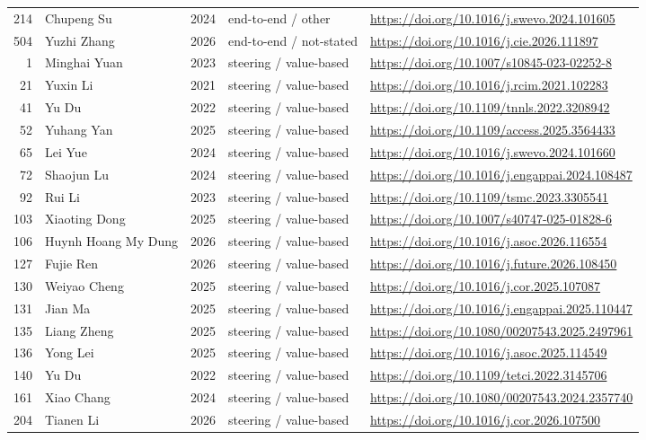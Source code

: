 \begin{longtable}{r p{3.0cm} r p{4.2cm} p{4.6cm}}
214 & Chupeng Su & 2024 & end-to-end / other & \url{https://doi.org/10.1016/j.swevo.2024.101605} \\
504 & Yuzhi Zhang & 2026 & end-to-end / not-stated & \url{https://doi.org/10.1016/j.cie.2026.111897} \\
1 & Minghai Yuan & 2023 & steering / value-based & \url{https://doi.org/10.1007/s10845-023-02252-8} \\
21 & Yuxin Li & 2021 & steering / value-based & \url{https://doi.org/10.1016/j.rcim.2021.102283} \\
41 & Yu Du & 2022 & steering / value-based & \url{https://doi.org/10.1109/tnnls.2022.3208942} \\
52 & Yuhang Yan & 2025 & steering / value-based & \url{https://doi.org/10.1109/access.2025.3564433} \\
65 & Lei Yue & 2024 & steering / value-based & \url{https://doi.org/10.1016/j.swevo.2024.101660} \\
72 & Shaojun Lu & 2024 & steering / value-based & \url{https://doi.org/10.1016/j.engappai.2024.108487} \\
92 & Rui Li & 2023 & steering / value-based & \url{https://doi.org/10.1109/tsmc.2023.3305541} \\
103 & Xiaoting Dong & 2025 & steering / value-based & \url{https://doi.org/10.1007/s40747-025-01828-6} \\
106 & Huynh Hoang My Dung & 2026 & steering / value-based & \url{https://doi.org/10.1016/j.asoc.2026.116554} \\
127 & Fujie Ren & 2026 & steering / value-based & \url{https://doi.org/10.1016/j.future.2026.108450} \\
130 & Weiyao Cheng & 2025 & steering / value-based & \url{https://doi.org/10.1016/j.cor.2025.107087} \\
131 & Jian Ma & 2025 & steering / value-based & \url{https://doi.org/10.1016/j.engappai.2025.110447} \\
135 & Liang Zheng & 2025 & steering / value-based & \url{https://doi.org/10.1080/00207543.2025.2497961} \\
136 & Yong Lei & 2025 & steering / value-based & \url{https://doi.org/10.1016/j.asoc.2025.114549} \\
140 & Yu Du & 2022 & steering / value-based & \url{https://doi.org/10.1109/tetci.2022.3145706} \\
161 & Xiao Chang & 2024 & steering / value-based & \url{https://doi.org/10.1080/00207543.2024.2357740} \\
204 & Tianen Li & 2026 & steering / value-based & \url{https://doi.org/10.1016/j.cor.2026.107500} \\

\end{longtable}
